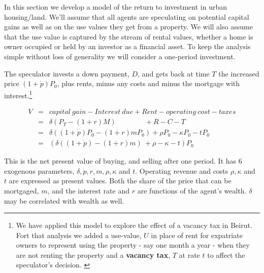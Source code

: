  In this section we develop a model of the return to investment in urban housing/land. We'll assume that all agents are speculating on potential capital gains as well as on the use values they get from a property.  We will also assume that the use value is captured by the stream of rental values, whether a home is owner occupied or  held by an investor as a financial asset. To keep the analysis simple without loss of generality we will consider a one-period investment.
 
 The speculator  invests a down payment, $D$, and gets back at time $T$ the  increased price $(1+\dot p)P_0$, plus rents, minus any costs and minus the mortgage with interest.\footnote{We have applied this model to explore the effect of a vacancy tax in Beirut.  Fort that analysis we  added a use-value, $U$ in place of rent for expatriate owners to represent using the property - say one month a year - when they are not renting the property and a \textbf{vacancy tax}, $T$ at rate $t$ to affect the speculator's  decision. \cite{Al-Shihabi}}


\begin{eqnarray*}
V  	&=& capital\ gain - Interest\ due  	+ Rent  - operating\ cost -taxes\\
&=& \delta(P_T- (1+r)M) \qquad \qquad 	 + R  	-C   - T\\
&=& \delta((1+\dot p)  P_0- (1+r)mP_0)   + \rho P_0  	-\kappa P_0 - tP_0\\
&=&( \delta((1+\dot p)  - (1+r)m) \ + \rho   	-\kappa -t) P_0
\end{eqnarray*}

This is the  net present value of buying, and selling after one period. It has  6 exogenous parameters, $\delta, \dot p, r, m, \rho, \kappa$ and $t$.   Operating revenue and costs $\rho, \kappa$ and $t$ are expressed as  present values. Both the  share of the price  that can be mortgaged, $m$, and the interest rate  and $r$ are functions of the agent's wealth. $\delta$ may be correlated with wealth as well. 

